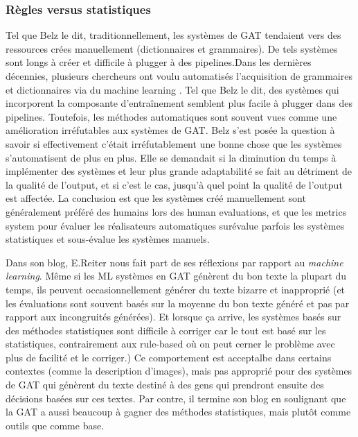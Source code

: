 \subsubsection{Règles versus statistiques}

Tel que Belz le dit, traditionnellement, les systèmes de \ac{GAT} tendaient vers des ressources crées manuellement (dictionnaires et grammaires). De tels systèmes sont longs à créer et difficile à plugger à des pipelines.Dans les dernières décennies, plusieurs chercheurs ont voulu automatisés l'acquisition de grammaires et dictionnaires via du machine learning \citep{LangkildeForestbasedStatisticalSentence2000}. Tel que Belz le dit, des systèmes qui incorporent la composante d'entraînement semblent plus facile à plugger dans des pipelines. Toutefois, les méthodes automatiques sont souvent vues comme une amélioration irréfutables aux systèmes de \ac{GAT}. Belz s'est posée la question à savoir si effectivement c'était irréfutablement une bonne chose que les systèmes s'automatisent de plus en plus\citep{BelzSystemBuildingCost2009}. Elle se demandait si la diminution du temps à implémenter des systèmes et leur plus grande adaptabilité se fait au détriment de la qualité de l'output, et si c'est le cas, jusqu'à quel point la qualité de l'output est affectée. La conclusion est que les systèmes créé manuellement sont généralement préféré des humains lors des human evaluations, et que les metrics system pour évaluer les réalisateurs automatiques surévalue parfois les systèmes statistiques et sous-évalue les systèmes manuels\citep{BelzSystemBuildingCost2009}.

Dans son blog, E.Reiter \citep{ReiterNaturalLanguageGeneration2016} nous fait part de ses réflexions par rapport au \emph{machine learning}. Même si les ML systèmes en \ac{GAT} génèrent du bon texte la plupart du temps, ils peuvent occasionnellement générer du texte bizarre et inapproprié (et les évaluations sont souvent basés sur la moyenne du bon texte généré et pas par rapport aux incongruités générées). Et lorsque ça arrive, les systèmes basés sur des méthodes statistiques sont difficile à corriger car le tout est basé sur les statistiques, contrairement aux rule-based où on peut cerner le problème avec plus de facilité et le corriger.) Ce comportement est acceptalbe dans certains contextes (comme la description d'images), mais pas approprié pour des systèmes de \ac{GAT} qui génèrent du texte destiné à des gens qui prendront ensuite des décisions basées sur ces textes. Par contre, il termine son blog en soulignant que la \ac{GAT} a aussi beaucoup à gagner des méthodes statistiques, mais plutôt comme outils que comme base.

